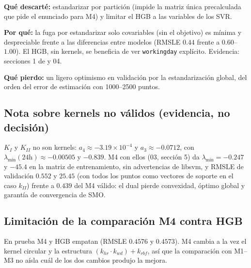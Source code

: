 \textbf{Qué descarté:} estandarizar por partición (impide la matriz única
precalculada que pide el enunciado para M4) y limitar el HGB a las variables
de los SVR.

\textbf{Por qué:} la fuga por estandarizar solo covariables (sin el objetivo)
es mínima y despreciable frente a las diferencias entre modelos (RMSLE
$0.44$ frente a $0.60$--$1.00$). El HGB, sin kernels, se beneficia de ver
\texttt{workingday} explícito. Evidencia: secciones 1 de
 y 04.

\textbf{Qué pierdo:} un ligero optimismo en validación por la
estandarización global, del orden del error de estimación con 1000--2500
puntos.

\subsection*{Nota sobre kernels no válidos (evidencia, no decisión)}

$K_I$ y $K_{II}$ no son kernels: $a_4\approx-3.19\times10^{-4}$ y
$a_3\approx-0.0712$, con $\lambda_{\min}(24\mathrm{h})\approx-0.00505$ y
$-0.839$. M4 con ellos (03, sección 5) da $\lambda_{\min}=-0.247$ y
$-45.4$ en la matriz de entrenamiento, sin advertencias de libsvm, y RMSLE
de validación $0.552$ y $25.45$ (con todos los puntos como vectores de
soporte en el caso $k_{II}$) frente a $0.439$ del M4 válido: el dual pierde
convexidad, óptimo global y garantía de convergencia de SMO.

\subsection*{Limitación de la comparación M4 contra HGB}
En prueba M4 y HGB empatan (RMSLE $0.4576$ y $0.4573$). M4 cambia a la vez el
kernel circular y la estructura $(k_{hr}\cdot k_{wd})+k_{rbf}$, así que la
comparación con M1--M3 no aísla cuál de los dos cambios produjo la mejora.
